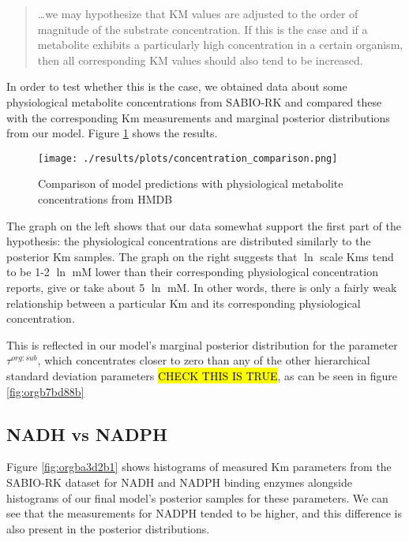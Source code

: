 \documentclass[11pt]{article}
\begin{document}
\begin{quote}
\ldots{}we may hypothesize that KM values are adjusted to the order of magnitude of
the substrate concentration. If this is the case and if a metabolite exhibits a
particularly high concentration in a certain organism, then all corresponding KM
values should also tend to be increased.
\end{quote}

In order to test whether this is the case, we obtained data about some
physiological metabolite concentrations from SABIO-RK and compared these with
the corresponding Km measurements and marginal posterior distributions from our
model. Figure \ref{fig:org651e45f} shows the results.

\begin{figure}[htbp]
\centering
\texttt{[image: ./results/plots/concentration\_comparison.png]}
\caption{\label{fig:org651e45f}Comparison of model predictions with physiological metabolite concentrations from HMDB}
\end{figure}

The graph on the left shows that our data somewhat support the first part of the
hypothesis: the physiological concentrations are distributed similarly to the
posterior Km samples. The graph on the right suggests that \(\ln\) scale Kms tend
to be 1-2 \(\ln\) mM lower than their corresponding physiological concentration
reports, give or take about 5 \(\ln\) mM. In other words, there is only a fairly
weak relationship between a particular Km and its corresponding physiological
concentration.

This is reflected in our model's marginal posterior distribution for the
parameter \(\tau^{org:sub}\), which concentrates closer to zero than any of the
other hierarchical standard deviation parameters \hl{CHECK THIS IS TRUE}, as can be
seen in figure \ref{fig:orgb7bd88b}

\subsection{NADH vs NADPH}
\label{sec:org9fbc199}

Figure \ref{fig:orgba3d2b1} shows histograms of measured Km parameters from the SABIO-RK
dataset for NADH and NADPH binding enzymes alongside histograms of our final
model's posterior samples for these parameters. We can see that the measurements
for NADPH tended to be higher, and this difference is also present in the posterior
distributions.
\end{document}
